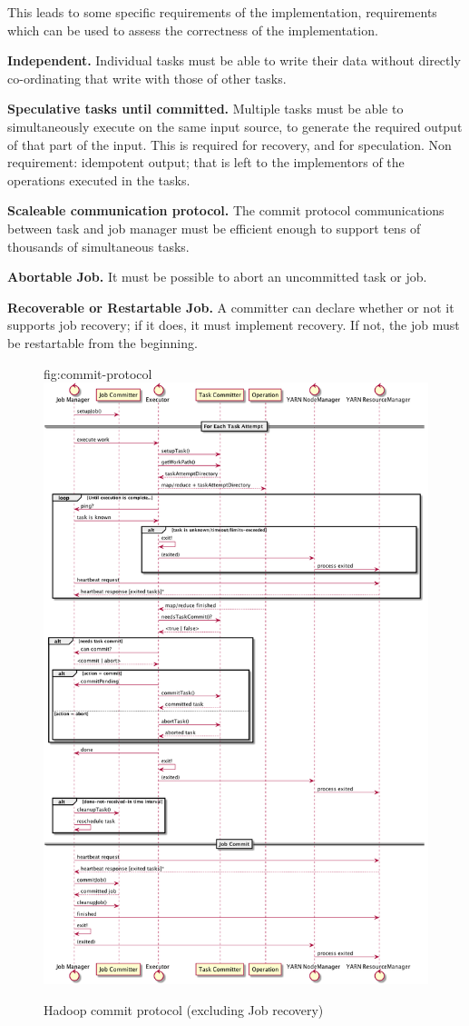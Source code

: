 \documentclass[9pt,technote]{IEEEtran}
\begin{document}
This leads to some specific requirements of the implementation, requirements
which can be used to assess the correctness of the implementation.

\textbf{Independent.}
Individual tasks must be able to write their data without directly
co-ordinating that write with those of other tasks.

\textbf{Speculative tasks until committed.}
Multiple tasks must be able to simultaneously execute on the same input
source, to generate the required output of that part of the input.
This is required for recovery, and for speculation.
Non requirement: idempotent output;
that is left to the implementors of the operations executed in the tasks.

\textbf{Scaleable communication protocol.}
The commit protocol communications between task and job manager
must be efficient enough to support tens of thousands of simultaneous
tasks.

\textbf{Abortable Job.}
It must be possible to abort an uncommitted task or job.

\textbf{Recoverable or Restartable Job.}
A committer can declare whether or not it supports job recovery;
if it does, it must implement recovery.
If not, the job must be restartable from the beginning.


\begin{figure}
  \caption{Hadoop commit protocol (excluding Job recovery)}
  \centering
  \figurename{fig:commit-protocol}
  \includegraphics[width=.8\textwidth]{commit-protocol.png}
\end{figure}
\end{document}
